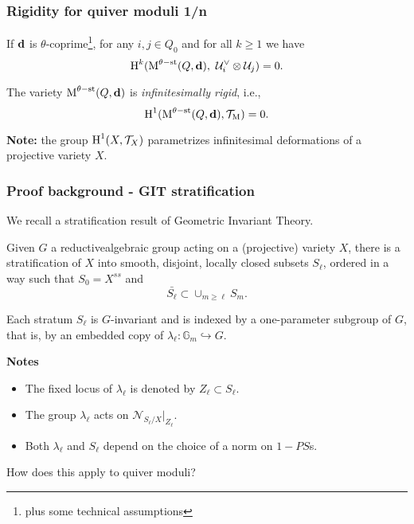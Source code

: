 \documentclass{beamer}
\begin{document}
\begin{frame}
    \frametitle{Rigidity for quiver moduli 1/n}
\begin{theorem}
If $\mathbf{d}$ is $\theta$-coprime\footnote{ plus some technical assumptions}, for any $i, j \in Q_0$ and for all $k \geq 1$ we have
\[\operatorname{H}^{k}(\operatorname{M}^{\theta-\mathrm{st}}(Q, \mathbf{d}),~\mathcal{U}^{\vee}_{i} \otimes \mathcal{U}_j) = 0. \]
\end{theorem} \pause
\begin{corollary}
The variety $\operatorname{M}^{\theta-\mathrm{st}}(Q, \mathbf{d})$ is \emph{infinitesimally rigid}, i.e.,
\[ \operatorname{H}^1(\operatorname{M}^{\theta-\mathrm{st}}(Q, \mathbf{d}), \mathcal{T}_{\operatorname{M}}) = 0. \]
\end{corollary} \pause

{\bf Note:} the group $\operatorname{H}^1(X, \mathcal{T}_{X})$ parametrizes infinitesimal
deformations of a projective variety $X$.
\end{frame}

\begin{frame}
    \frametitle{Proof background - GIT stratification}
We recall a stratification result of Geometric Invariant Theory. \pause
\begin{theorem}
Given $G$ a reductivealgebraic group
acting on a (projective) variety $X$,
there is a stratification of $X$
into smooth, disjoint, locally closed subsets $S_{\ell}$,
ordered in a way such that $S_0 = X^{ss}$ and
\[\bar{S_{\ell}} \subset \cup_{m \geq \ell} S_m.\]
\end{theorem} \pause

Each stratum $S_{\ell}$ is $G$-invariant and is indexed by
a one-parameter subgroup of $G$,
that is, by an embedded copy of
$\lambda_{\ell} \colon \mathbb{G}_m \hookrightarrow G$. \pause

{\bf Notes} \pause
\begin{itemize}
    \item The fixed locus of $\lambda_{\ell}$ is denoted by $Z_{\ell} \subset S_{\ell}$. \pause
    \item The group $\lambda_{\ell}$ acts on $\mathcal{N}_{S_{\ell}/X}|_{Z_{\ell}}$. \pause
    \item Both $\lambda_{\ell}$ and $S_{\ell}$ depend on the choice of a norm on $1-PS$s.
\end{itemize} \pause
How does this apply to quiver moduli?
\end{frame}
\end{document}
